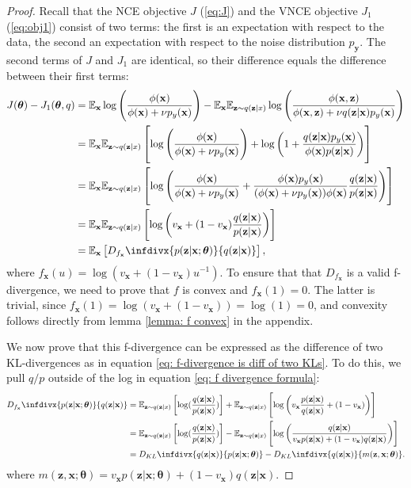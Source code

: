\documentclass[11pt, oneside]{article}
\newcommand{\thetab}{{\boldsymbol{\theta}}}
\newcommand{\pnn}{\phi}
\newcommand{\pnoise}{p_{ \mathbf y}}
\newcommand{\q}[1]{q(\z|{#1})}
\newcommand{\x}{{\mathbf x}}
\newcommand{\z}{{\mathbf z}}
\newcommand{\E}{\mathbb{E}}
\newcommand{\Ex}{\E_{\x}}
\newcommand{\Evar}[1]{\E_{\z \sim \q{#1}}}
\theoremstyle{definition}
\newcommand{\infdiv}[1]{D_{#1}\infdivx}
\begin{document}
\begin{proof}
Recall that the NCE objective $J$ (\ref{eq:J}) and the VNCE objective $J_1$ (\ref{eq:obj1}) consist of two terms: the first is an expectation with respect to the data, the second an expectation with respect to the noise distribution $\pnoise$. The second terms of $J$ and $J_1$ are identical, so their difference equals the difference between their first terms:
\begin{align}
    J(\thetab) - J_1(\thetab, q) 
    &= \Ex \log \left( \frac{\pnn(\x)}{\pnn(\x) + \nu p_{y}(\x)} \right) 
    - \Ex \Evar{x} \log \left( \frac{\pnn(\x, \z)}{\pnn(\x, \z) + \nu q(\z | \x) p_{y}(\x)} \right) \\
    &= \Ex \Evar{x} \left[ \log \left( \frac{\pnn(\x)}{\pnn(\x) + \nu p_{y}(\x)} \right) + \log \left( 1 + \frac{q(\z | \x) p_{y}(\x)}{\phi(\x) p(\z | \x)} \right) \right] \\
    &= \Ex \Evar{x} \left[ \log \left( \frac{\pnn(\x)}{\pnn(\x) + \nu p_{y}(\x)} + \frac{ \pnn(\x) p_{y}(\x)}{(\pnn(\x) + \nu p_{y}(\x))\phi(\x)} \frac{q(\z | \x)}{p(\z | \x)} \right) \right] \\
    \label{eq: f divergence formula}
    &= \Ex \Evar{x} \left[ \log \left( v_{\x} + (1 - v_{\x}) \frac{q(\z | \x)}{p(\z | \x)} \right) \right] \\
    &=  \Ex \left[ \infdiv{f_{\x}}{p(\z | \x; \thetab)}{q(\z | \x)} \right],
\end{align}
where $f_{\x}(u) = \log(v_{\x} + (1 - v_{\x})u^{-1})$. To ensure that that $D_{f_{\x}}$ is a valid f-divergence, we need to prove that $f$ is convex and $f_{\x}(1) = 0$. The latter is trivial, since $f_{\x}(1) = \log(v_{\x} + (1 - v_{\x})) = \log(1) = 0$, and convexity follows directly from lemma \ref{lemma: f convex} in the appendix.

We now prove that this f-divergence can be expressed as the difference of two KL-divergences as in equation \ref{eq: f-divergence is diff of two KLs}. To do this, we pull $q/p$ outside of the log in equation \ref{eq: f divergence formula}:
\begin{align}
    \infdiv{f_{\x}}{p(\z | \x; \thetab)}{q(\z | \x)} 
    &= \Evar{x} \left[ \log( \frac{q(\z | \x)}{p(\z | \x)}) \right] 
    + \Evar{x} \left[ \log \left( v_{\x}\frac{p(\z | \x)}{q(\z | \x)} + (1 - v_{\x}) \right) \right] \\
    &= \Evar{x} \left[ \log( \frac{q(\z | \x)}{p(\z | \x)}) \right] 
    - \Evar{x} \left[ \log \left( \frac{q(\z | \x)}{v_{\x}p(\z | \x) + (1 - v_{\x})q(\z | \x)} \right) \right] \\
    &= \infdiv{KL}{q(\z | \x)}{p(\z | \x; \thetab)} - \infdiv{KL}{q(\z | \x)}{m(\z, \x ; \thetab)}.
\end{align}
where $m(\z, \x ; \thetab) = v_{\x}p(\z | \x; \thetab) + (1 - v_{\x})q(\z | \x)$.
\end{proof}
\end{document}
